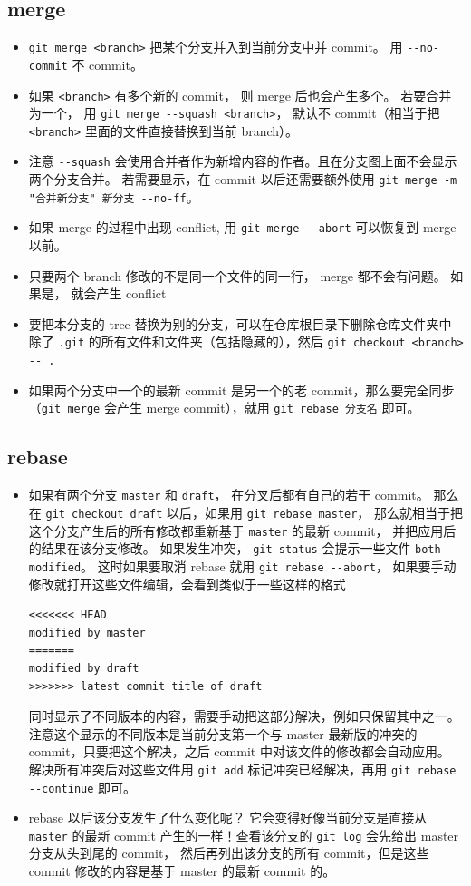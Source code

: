 \subsection{merge}
\begin{itemize}
\item \verb`git merge <branch>` 把某个分支并入到当前分支中并 commit。 用 \verb`--no-commit` 不 commit。
\item 如果 \verb`<branch>` 有多个新的 commit， 则 merge 后也会产生多个。 若要合并为一个， 用 \verb`git merge --squash <branch>`， 默认不 commit（相当于把 \verb`<branch>` 里面的文件直接替换到当前 branch）。
\item 注意 \verb`--squash` 会使用合并者作为新增内容的作者。且在分支图上面不会显示两个分支合并。 若需要显示，在 commit 以后还需要额外使用 \verb`git merge -m "合并新分支" 新分支 --no-ff`。
\item 如果 merge 的过程中出现 conflict, 用 \verb`git merge --abort` 可以恢复到 merge 以前。
\item 只要两个 branch 修改的不是同一个文件的同一行， merge 都不会有问题。 如果是， 就会产生 conflict
\item 要把本分支的 tree 替换为别的分支，可以在仓库根目录下删除仓库文件夹中除了 \verb`.git` 的所有文件和文件夹（包括隐藏的），然后 \verb`git checkout <branch> -- .`
\item 如果两个分支中一个的最新 commit 是另一个的老 commit，那么要完全同步（\verb`git merge` 会产生 merge commit），就用 \verb`git rebase 分支名` 即可。
\end{itemize}


\subsection{rebase}
\begin{itemize}
\item 如果有两个分支 \verb`master` 和 \verb`draft`， 在分叉后都有自己的若干 commit。 那么在 \verb`git checkout draft` 以后，如果用 \verb`git rebase master`， 那么就相当于把这个分支产生后的所有修改都重新基于 \verb`master` 的最新 commit， 并把应用后的结果在该分支修改。 如果发生冲突， \verb`git status` 会提示一些文件 \verb`both modified`。 这时如果要取消 rebase 就用 \verb`git rebase --abort`， 如果要手动修改就打开这些文件编辑，会看到类似于一些这样的格式
\begin{lstlisting}[language=none]
<<<<<<< HEAD
modified by master
=======
modified by draft
>>>>>>> latest commit title of draft
\end{lstlisting}
同时显示了不同版本的内容，需要手动把这部分解决，例如只保留其中之一。 注意这个显示的不同版本是当前分支第一个与 master 最新版的冲突的 commit，只要把这个解决，之后 commit 中对该文件的修改都会自动应用。 解决所有冲突后对这些文件用 \verb`git add` 标记冲突已经解决，再用 \verb`git rebase --continue` 即可。
\item rebase 以后该分支发生了什么变化呢？ 它会变得好像当前分支是直接从 \verb`master` 的最新 commit 产生的一样！查看该分支的 \verb`git log` 会先给出 master 分支从头到尾的 commit， 然后再列出该分支的所有 commit，但是这些 commit 修改的内容是基于 master 的最新 commit 的。
\end{itemize}
